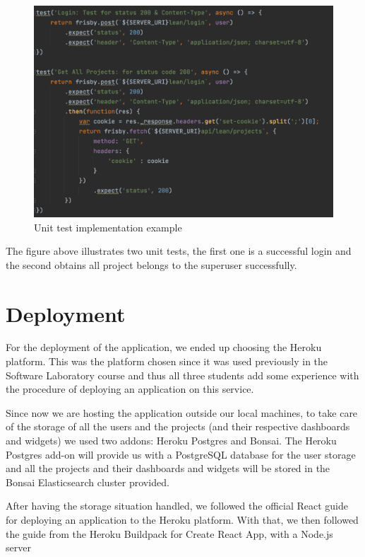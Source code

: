 \documentclass[a4paper,twoside,10pt]{report}
\begin{document}
\begin{figure}[h!]
\center
  \includegraphics[width=\textwidth]{tests.png}
\caption{Unit test implementation example}
\end{figure}

The figure above illustrates two unit tests, the first one is a successful login and the second obtains all project belongs to the superuser successfully.

\section{Deployment}
For the deployment of the application, we ended up choosing the Heroku platform. This was the platform chosen since it was used previously in the Software Laboratory course and thus all three students add some experience with the procedure of deploying an application on this service.

Since now we are hosting the application outside our local machines, to take care of the storage of all the users and the projects (and their respective dashboards and widgets) we used two addons: Heroku Postgres\cite{HEROKUPOSTGRES} and Bonsai. The Heroku Postgres add-on will provide us with a PostgreSQL database for the user storage and all the projects and their dashboards and widgets will be stored in the Bonsai Elasticsearch cluster provided.

After having the storage situation handled, we followed the official React guide for deploying an application\cite{REACTDEPLOYMENT} to the Heroku platform. With that, we then followed the guide from the Heroku Buildpack for Create React App, with a Node.js server
\end{document}
